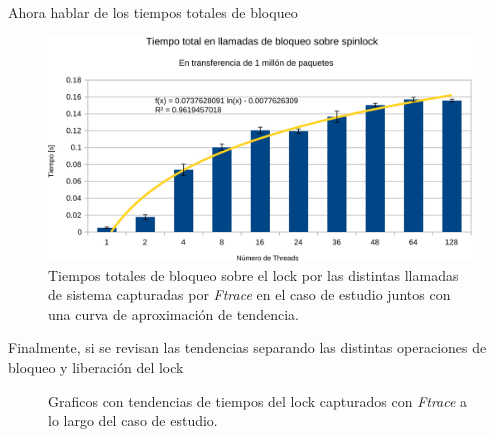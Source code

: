Ahora hablar de los tiempos totales de bloqueo
\begin{figure}[!h]
	\centering
	\includegraphics[scale=.5]{resultados/sumaFtrace-crop.pdf}
	\caption{Tiempos totales de bloqueo sobre el lock por las distintas llamadas de sistema capturadas por \emph{Ftrace} en el caso de estudio juntos con una curva de aproximación de tendencia.}
	\label{fig:sumaFtrace}
\end{figure}

Finalmente, si se revisan las tendencias separando las distintas operaciones de bloqueo y liberación del lock
\begin{figure}[h!]
	\centering
	\hspace*{\fill}
	\hfill
	\caption{Graficos con tendencias de tiempos del lock capturados con \emph{Ftrace} a lo largo del caso de estudio.}
	\label{fig:Ftracebloquealibera}
	\hspace*{\fill}
\end{figure}



